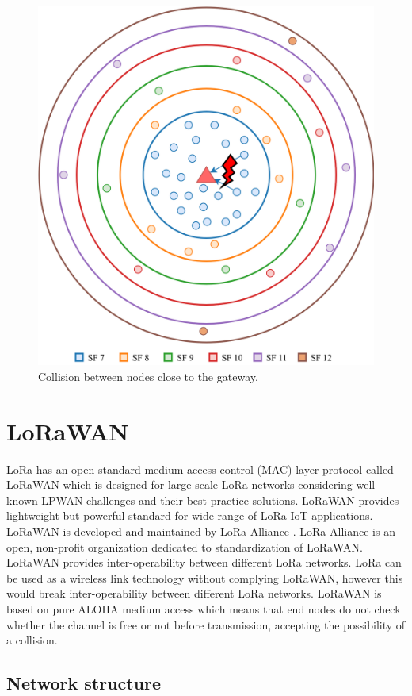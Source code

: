\begin{figure}
\centering
\includegraphics[width=.7\linewidth]{fig/lora_single_gw_collision.png}
\vspace*{5mm}
\caption{Collision between nodes close to the gateway.}
\label{fig:collision}
\end{figure}


\section{LoRaWAN}

LoRa has an open standard medium access control (MAC) layer protocol called LoRaWAN which is designed for large scale LoRa networks considering well known LPWAN challenges and their best practice solutions. LoRaWAN provides lightweight but powerful standard for wide range of LoRa IoT applications. LoRaWAN is developed and maintained by LoRa Alliance \cite{lora_alliance}. LoRa Alliance is an open, non-profit organization dedicated to standardization of LoRaWAN. LoRaWAN provides inter-operability between different LoRa networks. LoRa can be used as a wireless link technology without complying LoRaWAN, however this would break inter-operability between different LoRa networks. LoRaWAN is based on pure ALOHA medium access which means that end nodes do not check whether the channel is free or not before transmission, accepting the possibility of a collision. 

\subsection{Network structure}

